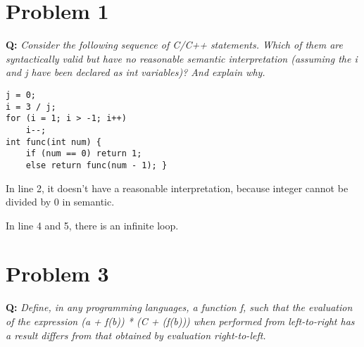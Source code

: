 \documentclass{article}
\begin{document}
\section*{Problem 1}
\textbf{Q:} \textit{Consider the following sequence of C/C++ statements. Which of them are syntactically valid but have no reasonable semantic interpretation (assuming the i and j have been declared as int variables)? And explain why.}

\begin{lstlisting}
j = 0;
i = 3 / j;
for (i = 1; i > -1; i++)
    i--;
int func(int num) {
    if (num == 0) return 1;
    else return func(num - 1); }
\end{lstlisting}

In line 2, it doesn't have a reasonable interpretation, because integer cannot be divided by 0 in semantic.

In line 4 and 5, there is an infinite loop.

\section*{Problem 3}
\textbf{Q:} \textit{Define, in any programming languages, a function f, such that the evaluation of the expression (a + f(b)) * (C + (f(b))) when performed from left-to-right has a result differs from that obtained by evaluation right-to-left.}
\end{document}
